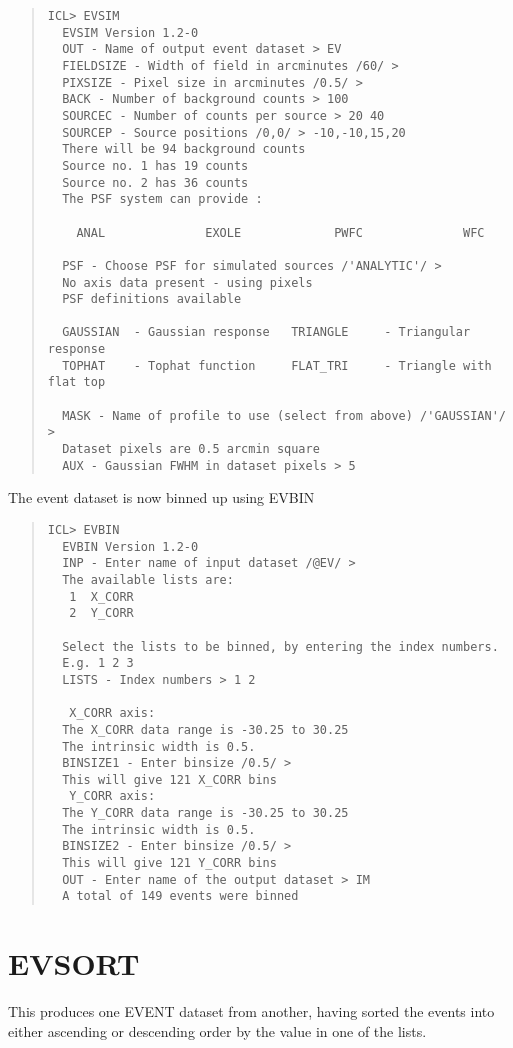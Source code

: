 \documentclass{book}
\renewcommand{\_}{{\tt\char'137}}     %
\begin{document}
\begin{quote}\begin{verbatim}
ICL> EVSIM
  EVSIM Version 1.2-0
  OUT - Name of output event dataset > EV
  FIELDSIZE - Width of field in arcminutes /60/ >
  PIXSIZE - Pixel size in arcminutes /0.5/ >
  BACK - Number of background counts > 100
  SOURCEC - Number of counts per source > 20 40
  SOURCEP - Source positions /0,0/ > -10,-10,15,20
  There will be 94 background counts
  Source no. 1 has 19 counts
  Source no. 2 has 36 counts
  The PSF system can provide :
 
    ANAL              EXOLE             PWFC              WFC
 
  PSF - Choose PSF for simulated sources /'ANALYTIC'/ >
  No axis data present - using pixels
  PSF definitions available
 
  GAUSSIAN  - Gaussian response   TRIANGLE     - Triangular response
  TOPHAT    - Tophat function     FLAT_TRI     - Triangle with flat top
 
  MASK - Name of profile to use (select from above) /'GAUSSIAN'/ >
  Dataset pixels are 0.5 arcmin square
  AUX - Gaussian FWHM in dataset pixels > 5
\end{verbatim}\end{quote}
The event dataset is now binned up using EVBIN
\begin{quote}\begin{verbatim}
ICL> EVBIN
  EVBIN Version 1.2-0
  INP - Enter name of input dataset /@EV/ >
  The available lists are:
   1  X_CORR
   2  Y_CORR
 
  Select the lists to be binned, by entering the index numbers.
  E.g. 1 2 3
  LISTS - Index numbers > 1 2
 
   X_CORR axis:
  The X_CORR data range is -30.25 to 30.25
  The intrinsic width is 0.5.
  BINSIZE1 - Enter binsize /0.5/ >
  This will give 121 X_CORR bins
   Y_CORR axis:
  The Y_CORR data range is -30.25 to 30.25
  The intrinsic width is 0.5.
  BINSIZE2 - Enter binsize /0.5/ >
  This will give 121 Y_CORR bins
  OUT - Enter name of the output dataset > IM
  A total of 149 events were binned
\end{verbatim}\end{quote}
\section{EVSORT}
This produces one EVENT dataset from another, having sorted the
events into either ascending or descending order by the value in
one of the lists.
\end{document}
